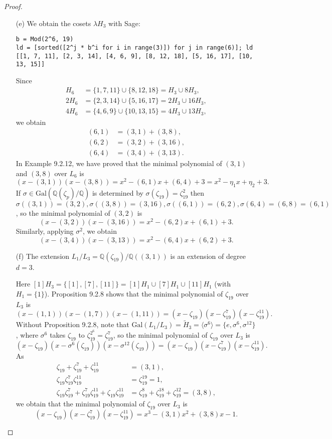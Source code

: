 \documentclass[11pt,a4paper]{article}
\newcommand{\Q}{\mathbb{Q}}
\newcommand{\Gal}{\mathrm{Gal}}
\begin{document}
\begin{proof}
\begin{enumerate}
\item[(e)]
We obtain the cosets $\lambda H_3$ with Sage:
\begin{verbatim}
b = Mod(2^6, 19)
ld = [sorted([2^j * b^i for i in range(3)]) for j in range(6)]; ld
[[1, 7, 11], [2, 3, 14], [4, 6, 9], [8, 12, 18], [5, 16, 17], [10, 13, 15]]
\end{verbatim}

Since
\begin{align*}
H_6 &= \{1,7,11\} \cup \{8,12,18\} = H_3 \cup 8 H_3,\\
2H_6 &=\{2,3,14\} \cup \{5,16,17\} = 2H_3 \cup 16H_3,\\
4H_6 &= \{4,6,9\} \cup \{10,13,15\} = 4H_3 \cup13H_3,
\end{align*}
we obtain
\begin{align*}
(6,1) &= (3,1) + (3,8),\\
(6,2) &= (3,2) + (3,16),\\
(6,4) &= (3,4) + (3,13).
\end{align*}
In Example 9.2.12, we have proved that the minimal polynomial of $(3,1)$ and $(3,8)$ over $L_6$ is
$$(x-(3,1))(x-(3,8)) = x^2 - (6,1)x + (6,4)+3 = x^2 - \eta_1 x + \eta_2 + 3.$$
If $\sigma  \in \Gal(\Q(\zeta_p)/\Q)$ is determined by $\sigma(\zeta_{19})= \zeta_{19}^2$ then $\sigma((3,1)) = (3,2),\sigma((3,8)) = (3,16) ,\sigma((6,1)) = (6,2),\sigma(6,4) = (6,8)=(6,1)$, so the minimal polynomial of $(3,2)$ is
$$(x-(3,2))(x-(3,16)) = x^2 - (6,2)x +(6,1)+3.$$
Similarly, applying $\sigma^2$, we obtain
$$(x-(3,4))(x-(3,13)) = x^2 - (6,4) x +(6,2)+3.$$


\item[(f)] The extension $L_1/L_3 = \Q(\zeta_{19})/\Q((3,1))$ is an extension of degree $d=3$. 

Here $[1]H_3 = \{[1],[7],[11]\} = [1]H_{1} \cup [7] H_{1} \cup [11] H_{1}$ (with $H_1=\{1\}$). Proposition 9.2.8 shows that the minimal polynomial of $\zeta_{19}$ over $L_3$ is
$$( x- (1,1))(x-(1,7))(x-(1,11)) = (x-\zeta_{19})(x-\zeta_{19}^7)(x- \zeta_{19}^{11}).$$
Without Proposition 9.2.8, note that $\Gal(L_1/L_3) = \tilde{H}_3 =  \langle \sigma^6 \rangle = \{e, \sigma^6, \sigma^{12}\}$, where $\sigma^6$ takes $\zeta_{19}$ to $\zeta_{19}^{2^6} = \zeta_{19}^7$, so the minimal polynomial of $\zeta_{19}$ over $L_3$ is
$$(x-\zeta_{19})(x-\sigma^6(\zeta_{19}))(x- \sigma^{12}(\zeta_{19})) = (x-\zeta_{19})(x-\zeta_{19}^7)(x- \zeta_{19}^{11}).$$
As 
\begin{align*}
\zeta_{19}+ \zeta_{19}^7+\zeta_{19}^{11} &= (3,1),\\
\zeta_{19} \zeta_{19}^7\zeta_{19}^{11} &= \zeta_{19}^{19} = 1,\\
\zeta_{19} \zeta_{19}^7+\zeta_{19}^7\zeta_{19}^{11}+\zeta_{19}\zeta_{19}^{11}  &= \zeta_{19}^8 + \zeta_{19}^{18}+ \zeta_{19}^{12} = (3,8),
\end{align*}
we obtain that the minimal polynomial of $\zeta_{19}$ over $L_3$ is
$$ (x-\zeta_{19})(x-\zeta_{19}^7)(x- \zeta_{19}^{11}) = x^3-(3,1)x^2+(3,8)x-1.$$

\end{enumerate}
\end{proof}
\end{document}
